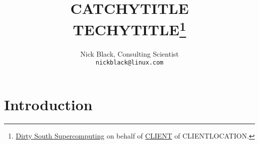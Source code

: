 \documentclass[letterpaper,10pt]{article}
\title{CATCHYTITLE\\
TECHYTITLE\thanks{
 \href{https://www.dsscaw.com/}{Dirty South Supercomputing} on behalf
 of \href{WEBSITE}{CLIENT} of CLIENTLOCATION.
}\\
}
\author{Nick Black, Consulting Scientist\\
\texttt{nickblack@linux.com}
}
\begin{document}
\maketitle
\thispagestyle{fancy}
\date{}
\begin{abstract}
\end{abstract}
\section{Introduction}
\printbibliography
\end{document}
